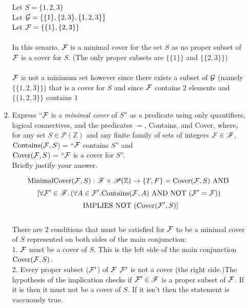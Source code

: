 \documentclass[11pt]{article}
\newcommand{\Implies}{\mbox{ IMPLIES }}
\newcommand{\And}{\mbox{ AND }}
\newcommand{\Not}{\mbox{NOT }}
\def\ints{{\mathbb Z}}
\begin{document}
\begin{enumerate}
\begin{enumerate}
\begin{solution}
Let $S = \{1,2,3\}$\\
Let ${\cal G} =  \{\{1\},\{2,3\}, \{1,2,3\}\}$\\
Let ${\cal F} = \{\{1\}, \{2,3\}\}$\\\\
In this senario, ${\cal F}$ is a minimal cover for the set $S$ as no proper subset of ${\cal F}$ is a cover for $S$. (The only proper subsets are $\{\{1\}\}$ and $\{\{2,3\}\}$)\\\\
${\cal F}$ is not a minimum set however since there exists a subset of ${\cal G}$ (namely $\{\{1,2,3\}\}$) that is a cover for $S$ and since ${\cal F}$ contains $2$ elements and $\{\{1,2,3\}\}$ contains $1$ \\
\end{solution}

\item
\begin{question}
Express ``${\cal F}$ is a {\em minimal cover} of $S$'' as a predicate using only quantifiers, logical connectives,
and the predicates $=$, Contains, and Cover,
where, for any set $S \in \mathscr{P}(\ints)$ and any finite family of sets of integers ${\cal F} \in \mathscr{F}$,\\
${\rm Contains}({\cal F},S $) = ``${\cal F}$ contains $S$'' and\\
${\rm Cover}({\cal F},S $) = ``${\cal F}$ is a cover for $S$''.\\
Briefly justify your answer.
\end{question}

\begin{solution}
$${\rm MinimalCover}({\cal F},S): \mathscr{F}\times \mathscr{P}(\ints)\rightarrow \{T,F\} ={\rm Cover}({\cal F},S) \And $$
$$[\forall{\cal F'}\in\mathscr{F}. \left(\forall  A\in {\cal F'}.{\rm Contains}({\cal F}, A) \And \Not({\cal F'} = {\cal F})\right)$$
$$\Implies \Not({\rm Cover}({\cal F'}, S) ]$$\\
There are $2$ conditions that must be satisfied for ${\cal F}$ to be a minimal cover of $S$ represented on both sides of the main conjunction:\\
1. ${\cal F}$ must be a cover of $S$. This is the left side of the main conjunction ${\rm Cover}({\cal F}, S)$. \\
2. Every proper subset (${\cal F'}$) of ${\cal F}$ ${\cal F'}$ is not a cover (the right side.)The hypothesis of the implication checks if ${\cal F'}\in \mathscr{F}$ is a proper subset of ${\cal F}$. If it is then it must not be a cover of $S$. If it isn't then the statement is vaccuously true.\\\\
\end{solution}


\end{enumerate}
\end{enumerate}
\end{document}
